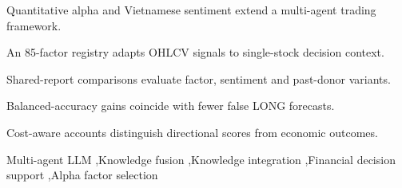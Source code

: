 \documentclass[preprint,12pt]{elsarticle}
\begin{document}
\begin{frontmatter}


\begin{highlights}
\item Quantitative alpha and Vietnamese sentiment extend a multi-agent trading framework.
\item An 85-factor registry adapts OHLCV signals to single-stock decision context.
\item Shared-report comparisons evaluate factor, sentiment and past-donor variants.
\item Balanced-accuracy gains coincide with fewer false LONG forecasts.
\item Cost-aware accounts distinguish directional scores from economic outcomes.
\end{highlights}

\begin{keyword}
Multi-agent LLM \sep Knowledge fusion \sep Knowledge integration \sep Financial decision support \sep Alpha factor selection
\end{keyword}

\end{frontmatter}












\end{document}
